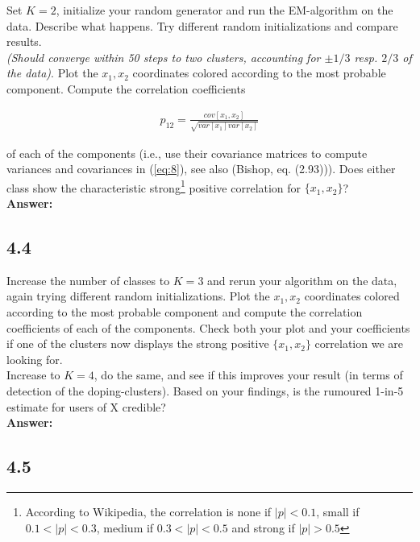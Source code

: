 \documentclass[a4paper]{article}
\begin{document}
Set $K = 2$, initialize your random generator and run the EM-algorithm on the data. Describe what happens. Try different random initializations and compare results.\\
\textit{(Should converge within 50 steps to two clusters, accounting for $\pm 1/3$ resp. $2/3$ of the data)}. Plot the $x_1, x_2$ coordinates colored according to the most probable component. Compute the correlation coefficients 

\begin{eqnarray} \label{eq:8}
p_{12} = \frac{cov[x_1, x_2]}{\sqrt{var[x_1] var[x_2]}}
\end{eqnarray}

of each of the components (i.e., use their covariance matrices to compute variances and covariances in (\ref{eq:8}), see also (Bishop, eq. (2.93))). Does either class show the characteristic strong\footnote{According to Wikipedia, the correlation is none if $|p| < 0.1$, small if $0.1 < |p| < 0.3$, medium if $0.3 < |p| < 0.5$ and strong if $|p| > 0.5$} positive correlation for $\{ x_1, x_2\}$?\\


\textbf{Answer:}\\







\subsection*{4.4}

Increase the number of classes to $K = 3$ and rerun your algorithm on the data, again trying different random initializations. Plot the $x_1, x_2$ coordinates colored according to the most probable component and compute the correlation coefficients of each of the components. Check both your plot and your coefficients if one of the clusters now displays the strong positive $\{ x_1, x_2\}$ correlation we are looking for.\\
Increase to $K = 4$, do the same, and see if this improves your result (in terms of detection of the doping-clusters). Based on your findings, is the rumoured 1-in-5 estimate for users of X credible?\\


\textbf{Answer:}\\



\subsection*{4.5}
\end{document}
